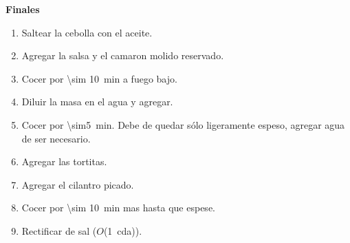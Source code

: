 \textbf{Finales}
\begin{enumerate}
\item Saltear la cebolla con el aceite.
\item Agregar la salsa y el camaron molido reservado.
\item Cocer por \SI{\sim 10}{min} a fuego bajo.
\item Diluir la masa en el agua y agregar.
\item Cocer por \SI{\sim5}{min}. Debe de quedar sólo ligeramente espeso, agregar agua de ser necesario.
\item Agregar las tortitas.
\item Agregar el cilantro picado.
\item Cocer por \SI{\sim 10}{min} mas hasta que espese. 
\item Rectificar de sal ($O$(\SI{1}{cda})).
\end{enumerate}
